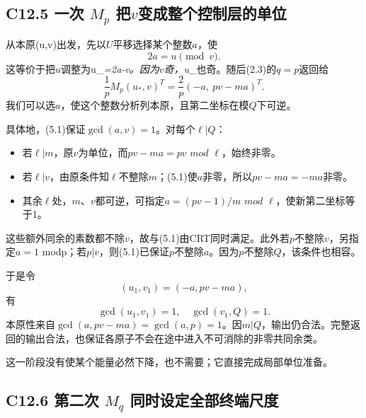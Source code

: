 \subsection*{\texorpdfstring{{C12.5} {一次} {\ensuremath{M_{p}}} {把\ensuremath{v}变成整个控制层的单位}}{C12.5 一次  把变成整个控制层的单位}}\label{C12-h87}

{从本原(u,v)出发，先以\ensuremath{U}平移选择某个整数\ensuremath{a}，使} \[
2a=u\pmod v.
\tag{C12.5.1}
\] {这等价于把\ensuremath{u}调整为u\_}\emph{{=2a-v。因为\ensuremath{v}奇，u\_}}{也奇。随后(2.3)的\ensuremath{q=p}返回给} \[
\frac1pM_p(u_*,v)^T
=\frac2p(-a,\ pv-ma)^T.
\tag{C12.5.2}
\] {我们可以选\ensuremath{a}，使这个整数分析列本原，且第二坐标在模\ensuremath{Q}下可逆。}

{具体地，(5.1)保证\ensuremath{\operatorname{gcd}(a,v)=1}。对每个\ensuremath{\ell |Q}：}

\begin{itemize}
\tightlist
\item
  {若\ensuremath{\ell |m}，原\ensuremath{v}为单位，而\ensuremath{pv-ma=pv}} {\ensuremath{mod}} {\ensuremath{\ell }，始终非零。}
\item
  {若\ensuremath{\ell |v}，由原条件知\ensuremath{\ell }不整除\ensuremath{m}；(5.1)使\ensuremath{a}非零，所以\ensuremath{pv-ma=-ma}非零。}
\item
  {其余\ensuremath{\ell }处，\ensuremath{m}、\ensuremath{v}都可逆，可指定\ensuremath{a=(pv-1)/m}} {\ensuremath{mod}} {\ensuremath{\ell }，使新第二坐标等于1。}
\end{itemize}

{这些额外同余的素数都不除\ensuremath{v}，故与(5.1)由CRT同时满足。此外若\ensuremath{p}不整除\ensuremath{v}，另指定\ensuremath{a=1}} {modp；若\ensuremath{p|v}，则(5.1)已保证\ensuremath{p}不整除\ensuremath{a}。因为\ensuremath{p}不整除\ensuremath{Q}，该条件也相容。}

{于是令} \[
(u_1,v_1)=(-a,pv-ma),
\] {有} \[
\boxed{\gcd(u_1,v_1)=1,\quad\gcd(v_1,Q)=1.}
\tag{C12.5.3}
\] {本原性来自\ensuremath{\operatorname{gcd}(a,pv-ma)=\operatorname{gcd}(a,p)=1}。因\ensuremath{m|Q}，输出仍合法。完整返回的输出合法，也保证各原子不会在途中进入不可消除的非零共同余类。}

{这一阶段没有使某个能量必然下降，也不需要；它直接完成局部单位准备。}

\subsection*{\texorpdfstring{{C12.6} {第二次} {\ensuremath{M_{q}}} {同时设定全部终端尺度}}{C12.6 第二次  同时设定全部终端尺度}}\label{C12-h88}

